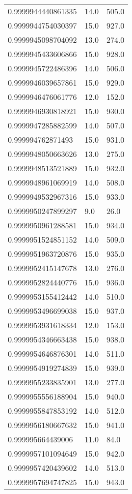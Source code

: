 \begin{center}
\begin{supertabular}[H]{p{0.30\textwidth}p{0.05\textwidth}p{0.05\textwidth}}
0.9999944440861335 & 14.0 & 505.0 \\ 
0.9999944754030397 & 15.0 & 927.0 \\ 
0.9999945098704092 & 13.0 & 274.0 \\ 
0.9999945433606866 & 15.0 & 928.0 \\ 
0.9999945722486396 & 14.0 & 506.0 \\ 
0.9999946039657861 & 15.0 & 929.0 \\ 
0.9999946476061776 & 12.0 & 152.0 \\ 
0.9999946930818921 & 15.0 & 930.0 \\ 
0.9999947285882599 & 14.0 & 507.0 \\ 
0.999994762871493 & 15.0 & 931.0 \\ 
0.9999948050663626 & 13.0 & 275.0 \\ 
0.9999948513521889 & 15.0 & 932.0 \\ 
0.9999948961069919 & 14.0 & 508.0 \\ 
0.9999949532967316 & 15.0 & 933.0 \\ 
0.9999950247899297 & 9.0 & 26.0 \\ 
0.9999950961288581 & 15.0 & 934.0 \\ 
0.9999951524851152 & 14.0 & 509.0 \\ 
0.9999951963720876 & 15.0 & 935.0 \\ 
0.9999952415147678 & 13.0 & 276.0 \\ 
0.9999952824440776 & 15.0 & 936.0 \\ 
0.9999953155412442 & 14.0 & 510.0 \\ 
0.9999953496699038 & 15.0 & 937.0 \\ 
0.9999953931618334 & 12.0 & 153.0 \\ 
0.9999954346663438 & 15.0 & 938.0 \\ 
0.9999954646876301 & 14.0 & 511.0 \\ 
0.9999954919274839 & 15.0 & 939.0 \\ 
0.9999955233835901 & 13.0 & 277.0 \\ 
0.9999955556188904 & 15.0 & 940.0 \\ 
0.9999955847853192 & 14.0 & 512.0 \\ 
0.9999956180667632 & 15.0 & 941.0 \\ 
0.999995664439006 & 11.0 & 84.0 \\ 
0.9999957101094649 & 15.0 & 942.0 \\ 
0.9999957420439602 & 14.0 & 513.0 \\ 
0.9999957694747825 & 15.0 & 943.0 \\ 

\end{supertabular}
\end{center}
